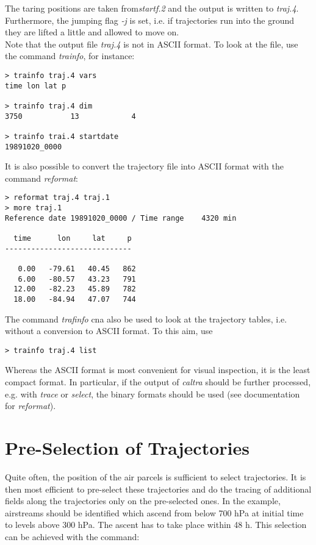 \documentclass[a4paper,10pt]{article}
\begin{document}
\noindent
The taring positions are taken from{\em startf.2} and the output is written to {\em traj.4}. Furthermore, the jumping flag {\em -j} is set, i.e. if trajectories run into the ground they are lifted a little and allowed to move on.\\

\noindent
Note that the output file {\em traj.4} is not in ASCII format. To look at the file, use the command {\em trainfo}, for instance:

\begin{verbatim}
> trainfo traj.4 vars
time lon lat p 

> trainfo traj.4 dim
3750           13            4

> trainfo trai.4 startdate
19891020_0000
\end{verbatim}
 
\noindent
It is also possible to convert the trajectory file into ASCII format with the command {\em reformat}:

\begin{verbatim}
> reformat traj.4 traj.1
> more traj.1
Reference date 19891020_0000 / Time range    4320 min

  time      lon     lat     p
-----------------------------

   0.00   -79.61   40.45   862
   6.00   -80.57   43.23   791
  12.00   -82.23   45.89   782
  18.00   -84.94   47.07   744
\end{verbatim}

\noindent
The command {\em trafinfo} cna also be used to look at the trajectory tables, i.e. without a conversion to ASCII format. To this aim, use

\begin{verbatim}
> trainfo traj.4 list
\end{verbatim}

\noindent
Whereas the ASCII format is most convenient for visual inspection, it is the least compact format. In particular, if the output of {\em caltra} should be further processed, e.g. with {\em trace} or {\em select}, the binary formats should be used (see documentation for {\em reformat}).

\section{Pre-Selection of Trajectories}

Quite often, the position of the air parcels is sufficient to select trajectories. It is then most efficient to pre-select these trajectories and do the tracing of additional fields along the trajectories only on the pre-selected ones. In the example, airstreams should be identified which ascend from below 700 hPa at initial time to levels above 300 hPa. The ascent has to take place within 48 h. This selection can be achieved with the command:
\end{document}
